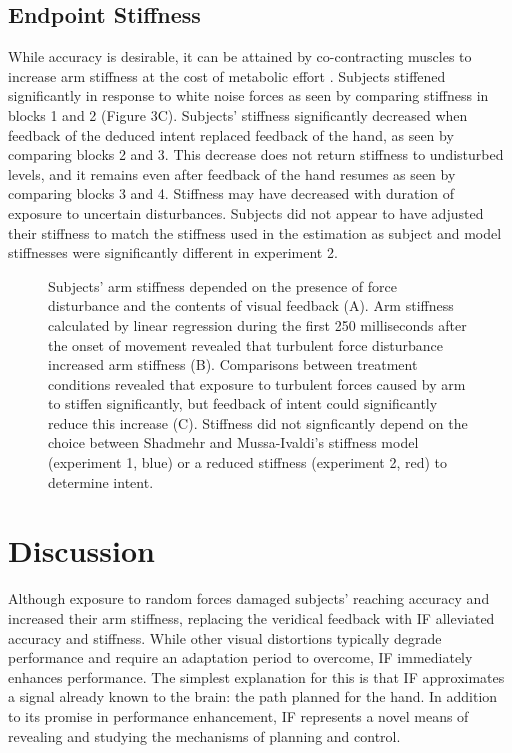 \documentclass{frontiersSCNS} %
\begin{document}
\subsection*{Endpoint Stiffness}
While accuracy is desirable, it can be attained by co-contracting muscles to increase arm stiffness at the cost of metabolic effort \citep{gribble2003role, takahashi2001impedance}. Subjects stiffened significantly in response to white noise forces as seen by comparing stiffness in blocks 1 and 2 (Figure 3C). Subjects' stiffness significantly decreased when feedback of the deduced intent replaced feedback of the hand, as seen by comparing blocks 2 and 3. This decrease does not return stiffness to undisturbed levels, and it remains even after feedback of the hand resumes as seen by comparing blocks 3 and 4. Stiffness may have decreased with duration of exposure to uncertain disturbances\citep{takahashi2001impedance}. Subjects did not appear to have adjusted their stiffness to match the stiffness used in the estimation as subject and model stiffnesses were significantly different in experiment 2.

\begin{figure}[t]
\centering
{}
\caption{Subjects' arm stiffness depended on the presence of force disturbance and the contents of visual feedback (A). Arm stiffness calculated by linear regression during the first 250 milliseconds after the onset of movement revealed that turbulent force disturbance increased arm stiffness (B). Comparisons between treatment conditions revealed that exposure to turbulent forces caused by arm to stiffen significantly, but feedback of intent could significantly reduce this increase (C). Stiffness did not signficantly depend on the choice between Shadmehr and Mussa-Ivaldi's\cite{shadmehr1994adaptive} stiffness model (experiment 1, blue) or a reduced stiffness (experiment 2, red) to determine intent.}
\label{stiffness}
\end{figure}


\section{Discussion}

Although exposure to random forces damaged subjects’ reaching accuracy and increased their arm stiffness, replacing the veridical feedback with IF alleviated accuracy and stiffness. While other visual distortions typically degrade performance and require an adaptation period to overcome, IF immediately enhances performance. The simplest explanation for this is that IF approximates a signal already known to the brain: the path planned for the hand. In addition to its promise in performance enhancement, IF represents a novel means of revealing and studying the mechanisms of planning and control.
\end{document}
